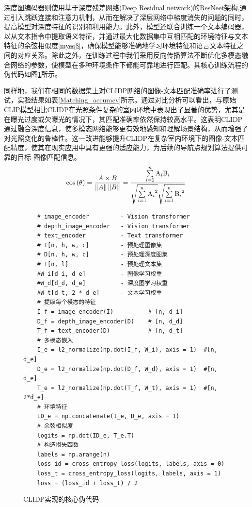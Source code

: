 深度图编码器则使用基于深度残差网络(Deep Residual network)的ResNeet架构,通过引入跳跃连接和注意力机制，从而在解决了深层网络中梯度消失的问题的同时，提高模型对深度特征的识别和利用能力。此外，模型还联合训练一个文本编码器，以从文本指令中提取语义特征，并通过最大化数据集中互相匹配的环境特征与文本特征的余弦相似度\eqref{myeq8}，确保模型能够准确地学习环境特征和语言文本特征之间的对应关系。除此之外，在训练过程中我们采用反向传播算法不断优化多模态融合网络的参数，使模型在多种环境条件下都能可靠地进行匹配。其核心训练流程的伪代码如图\ref{CLIDP_CODE}所示。


同样地，我们在相同的数据集上对CLIDP网络的图像-文本匹配准确率进行了测试，实验结果如表\ref{Matching_accuracy}所示。通过对比分析可以看出，与原始CLIP模型相比CLIDP在光照条件复杂的室内环境中表现出了显著的优势，尤其是在曝光过度或欠曝光的情况下，其匹配准确率依然保持较高水平。这表明CLIDP通过融合深度信息，使多模态网络能够更有效地感知和理解场景结构，从而增强了对光照变化的鲁棒性。这一改进能够提升CLIDP在复杂室内环境下的图像-文本匹配精度，使其在现实应用中具有更强的适应能力，为后续的导航点规划算法提供可靠的目标-图像匹配信息。
\begin{equation}
    \cos \left( \theta  \right) = \frac{{A \times B}}{{\left\| A \right\|\left\| B \right\|}} = \frac{{\sum\limits_{i = 1}^n {{{\rm A}_i}{{\rm B}_i}} }}{{\sqrt {\sum\limits_{i = 1}^n {{{\rm A}_i}^2} } \sqrt {\sum\limits_{i = 1}^n {{{\rm B}_i}^2} } }}
        \label{myeq8}
    \end{equation}

\begin{figure}[H]
    \begin{lstlisting} 
    # image_encoder	        - Vision transformer
    # depth_image_encoder	- Vision transformer
    # text_encoder	        - Text transformer
    # I[n, h, w, c]	        - 预处理图像集
    # D[n, h, w, c]	        - 预处理深度图集
    # T[n, l]	            - 预处理文本集
    #W_i[d_i, d_e]	        - 图像学习权重
    #W_d[d_d, d_e]	        - 深度图学习权重
    #W_t[d_t, 2 * d_e]	    - 文本学习权重
    # 提取每个模态的特征
    I_f = image_encoder(I)	        # [n, d_i]
    D_f = depth_image_encoder(D)	# [n, d_d]
    T_f = text_encoder(D)	        # [n, d_t]
    # 多模态嵌入
    I_e = l2_normalize(np.dot(I_f, W_i), axis = 1)	#[n, d_e]
    D_e = l2_normalize(np.dot(D_f, W_d), axis = 1)	#[n, d_e]
    T_e = l2_normalize(np.dot(T_f, W_t), axis = 1)	#[n, 2*d_e]
    # 环境特征
    ID_e = np.concatenate(I_e, D_e, axis = 1)
    # 余弦相似度
    logits = np.dot(ID_e, T_e.T)
    # 构造损失函数
    labels = np.arange(n)
    loss_id = cross_entropy_loss(logits, labels, axis = 0)
    loss_t = cross_entropy_loss(logits, labels, axis = 1)
    loss = (loss_id + loss_t) / 2
    \end{lstlisting}
    \caption{CLIDP实现的核心伪代码}
    \label{CLIDP_CODE}
    \end{figure}
    



